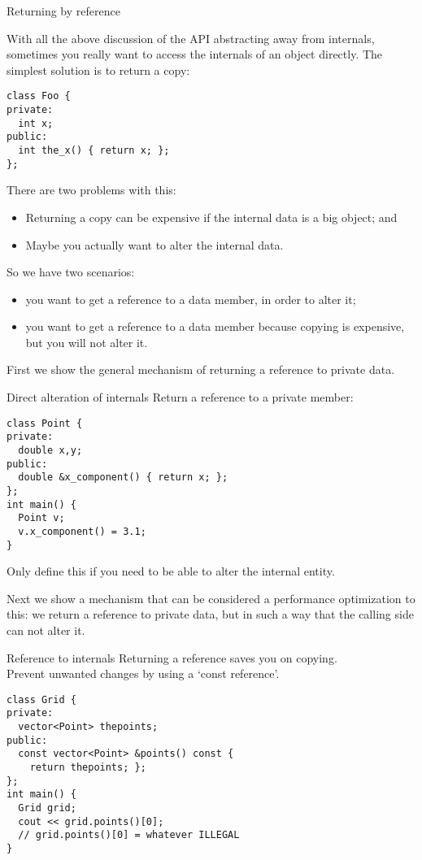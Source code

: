  {Returning by reference}


With all the above discussion of the \ac{API} abstracting away from internals,
sometimes you really want to access the internals of an object directly.
The simplest solution is to return a copy:
\begin{lstlisting}
class Foo {
private:
  int x;
public:
  int the_x() { return x; };
};
\end{lstlisting}
There are two problems with this:
\begin{itemize}
\item
  Returning a copy can be expensive if the internal data is a big object; and
\item 
  Maybe you actually want to alter the internal data.
\end{itemize}

So we have two scenarios:
\begin{itemize}
\item you want to get a reference to a data member, in order to alter it;
\item you want to get a reference to a data member because copying is expensive,
  but you will not alter it.
\end{itemize}

First we show the general mechanism of returning
a reference to private data.

\begin{block}{Direct alteration of internals}
  \label{sl:obj-return-ref}
  Return a reference to a private member:
  \lstset{style=snippetcode}
\begin{lstlisting}
class Point {
private:
  double x,y;
public:
  double &x_component() { return x; };
};
int main() {
  Point v;
  v.x_component() = 3.1;
}
\end{lstlisting}
Only define this if you need to be able to alter the internal entity.
\end{block}

Next we show a mechanism that can be considered a performance optimization
to this: we return a reference to private data, but in such a way
that the calling side can not alter it.

\begin{block}{Reference to internals}
  \label{sl:obj-return-const-ref}
  Returning a reference saves you on copying.\\
  Prevent unwanted changes by using a `const reference'.
  \lstset{style=snippetcode}
\begin{lstlisting}
class Grid {
private:
  vector<Point> thepoints;
public:
  const vector<Point> &points() const {
    return thepoints; };
};
int main() {
  Grid grid;
  cout << grid.points()[0];
  // grid.points()[0] = whatever ILLEGAL
}
\end{lstlisting}
\end{block}

